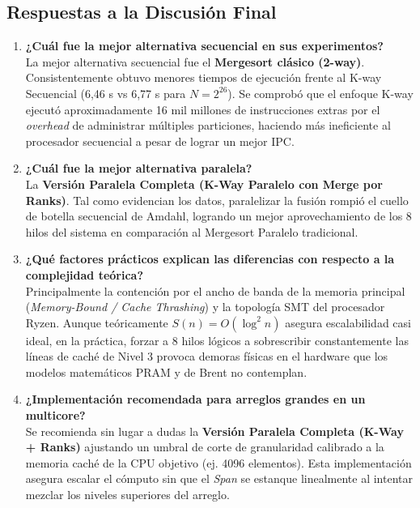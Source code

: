 \documentclass[12pt, a4paper]{article}
\begin{document}
\subsection{Respuestas a la Discusión Final}
\begin{enumerate}
    \item \textbf{¿Cuál fue la mejor alternativa secuencial en sus experimentos?} \\
    La mejor alternativa secuencial fue el \textbf{Mergesort clásico (2-way)}. Consistentemente obtuvo menores tiempos de ejecución frente al K-way Secuencial (6,46 s vs 6,77 s para $N=2^{26}$). Se comprobó que el enfoque K-way ejecutó aproximadamente 16 mil millones de instrucciones extras por el \textit{overhead} de administrar múltiples particiones, haciendo más ineficiente al procesador secuencial a pesar de lograr un mejor IPC.
    
    \item \textbf{¿Cuál fue la mejor alternativa paralela?} \\
    La \textbf{Versión Paralela Completa (K-Way Paralelo con Merge por Ranks)}. Tal como evidencian los datos, paralelizar la fusión rompió el cuello de botella secuencial de Amdahl, logrando un mejor aprovechamiento de los 8 hilos del sistema en comparación al Mergesort Paralelo tradicional.
    
    \item \textbf{¿Qué factores prácticos explican las diferencias con respecto a la complejidad teórica?} \\
    Principalmente la contención por el ancho de banda de la memoria principal (\textit{Memory-Bound / Cache Thrashing}) y la topología SMT del procesador Ryzen. Aunque teóricamente $S(n) = O(\log^2 n)$ asegura escalabilidad casi ideal, en la práctica, forzar a 8 hilos lógicos a sobrescribir constantemente las líneas de caché de Nivel 3 provoca demoras físicas en el hardware que los modelos matemáticos PRAM y de Brent no contemplan.
    
    \item \textbf{¿Implementación recomendada para arreglos grandes en un multicore?} \\
    Se recomienda sin lugar a dudas la \textbf{Versión Paralela Completa (K-Way + Ranks)} ajustando un umbral de corte de granularidad calibrado a la memoria caché de la CPU objetivo (ej. 4096 elementos). Esta implementación asegura escalar el cómputo sin que el \textit{Span} se estanque linealmente al intentar mezclar los niveles superiores del arreglo.
\end{enumerate}
\end{document}
